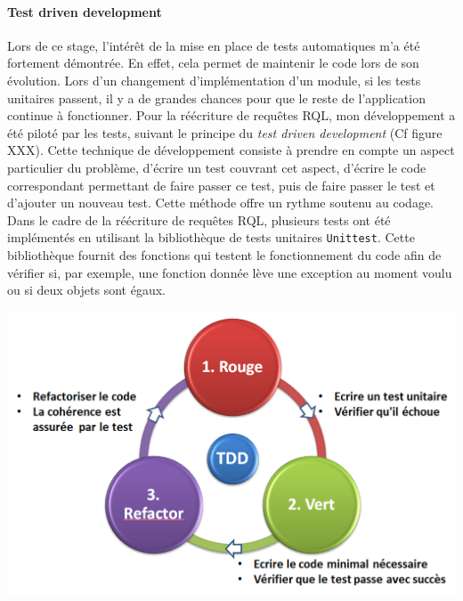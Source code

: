 \documentclass {report}
\begin{document}
\paragraph{Test driven development}
Lors de ce stage, l'intérêt de la mise en place de tests automatiques m'a été fortement démontrée. En effet, cela permet de maintenir le code lors de son évolution. Lors d’un changement d’implémentation d’un module, si les tests unitaires passent, il y a de grandes chances pour que le reste de l’application continue à fonctionner. Pour la réécriture de requêtes RQL, mon développement a été piloté par les tests, suivant le principe du \textit{test driven development} (Cf figure XXX). Cette technique de développement consiste à prendre en compte un aspect particulier du problème, d'écrire un test couvrant cet aspect, d'écrire le code correspondant permettant de faire passer ce test, puis de faire passer le test et d'ajouter un nouveau test. Cette méthode offre un rythme soutenu au codage. Dans le cadre de la réécriture de requêtes RQL, plusieurs tests ont été implémentés en utilisant la bibliothèque de tests unitaires \verb+Unittest+. Cette bibliothèque fournit des fonctions qui testent le fonctionnement du code afin de vérifier si, par exemple, une fonction donnée lève une exception au moment voulu ou si deux objets sont égaux. 

\begin{center}
\includegraphics{tdd.png}
\end{center}
\end{document}
